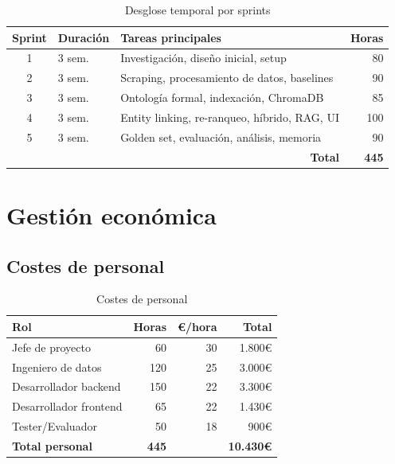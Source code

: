 \documentclass[12pt, a4paper, twoside]{report}
\begin{document}
\begin{table}[H]
\centering
\caption{Desglose temporal por sprints}
\label{tab:sprints-table}
\begin{tabularx}{\textwidth}{clXr}
\toprule
\textbf{Sprint} & \textbf{Duraci\'on} & \textbf{Tareas principales} & \textbf{Horas} \\
\midrule
1 & 3 sem. & Investigaci\'on, dise\~no inicial, setup & 80 \\
2 & 3 sem. & Scraping, procesamiento de datos, baselines & 90 \\
3 & 3 sem. & Ontolog\'ia formal, indexaci\'on, ChromaDB & 85 \\
4 & 3 sem. & Entity linking, re-ranqueo, h\'ibrido, RAG, UI & 100 \\
5 & 3 sem. & Golden set, evaluaci\'on, an\'alisis, memoria & 90 \\
\midrule
\multicolumn{3}{r}{\textbf{Total}} & \textbf{445} \\
\bottomrule
\end{tabularx}
\end{table}

\section{Gesti\'on econ\'omica}

\subsection{Costes de personal}

\begin{table}[H]
\centering
\caption{Costes de personal}
\label{tab:costes-personal}
\begin{tabular}{lrrr}
\toprule
\textbf{Rol} & \textbf{Horas} & \textbf{\euro/hora} & \textbf{Total} \\
\midrule
Jefe de proyecto & 60 & 30 & 1.800\euro \\
Ingeniero de datos & 120 & 25 & 3.000\euro \\
Desarrollador backend & 150 & 22 & 3.300\euro \\
Desarrollador frontend & 65 & 22 & 1.430\euro \\
Tester/Evaluador & 50 & 18 & 900\euro \\
\midrule
\textbf{Total personal} & \textbf{445} & & \textbf{10.430\euro} \\
\bottomrule
\end{tabular}
\end{table}
\end{document}
